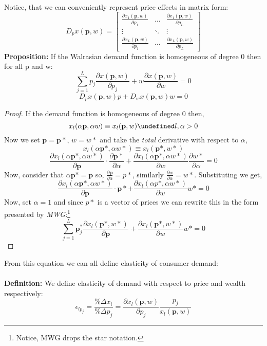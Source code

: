 \documentclass[12pt]{article}
\let\oldforall\forall
\let\forall\undefined
\let\bf\oldbf
\let\bf\textbf
\DeclareMathOperator{\forall}{\,\oldforall\,}
\begin{document}
\\ Notice, that we can conveniently represent price effects in matrix form:
$$D_p x(\bf{p}, w) = \begin{bmatrix} 
\frac{\partial x_1(\bf{p}, w)}{\partial p_1} & \dots & \frac{\partial x_1(\bf{p}, w)}{\partial p_L}\\
 \vdots & \ddots & \vdots \\
\frac{\partial x_L(\bf{p}, w)}{\partial p_1} & \dots & \frac{\partial x_L(\bf{p}, w)}{\partial p_L} 
\end{bmatrix}$$
\bf{Proposition:} If the Walrasian demand function is homogeneous of degree 0 then for all p and w: 
$$\sum^L_{j=1} p_j \frac{\partial x(\bf{p}, w)}{\partial p_j} + w\frac{\partial x(\bf{p}, w)}{\partial w} = 0$$
$$D_px(\bf{p}, w)p + D_wx(\bf{p}, w)w = 0$$

\begin{proof}
If the demand function is homogeneous of degree 0 then,
$$x_l(\alpha\bf{p}, \alpha w) \equiv x_l(\bf{p}, w) \forall l, \alpha > 0$$
Now we set $\bf{p} = \bf{p}*$, $w = w*$ and take the \emph{total} derivative with respect to $\alpha$,
$$x_l(\alpha\bf{p}*, \alpha w*) \equiv x_l(\bf{p}*, w*)$$
$$\frac{\partial x_l(\alpha \bf{p}*, \alpha w*)}{\partial \bf{p}}\cdot\frac{\partial \bf{p}*}{\partial \alpha} + \frac{\partial x_l(\alpha \bf{p}*, \alpha w*)}{\partial w}\frac{\partial w*}{\partial \alpha} = 0$$
Now, consider that $\alpha \bf{p}* = \bf{p}$ so, $\frac{\partial \bf{p}}{\partial \alpha} = p*$, similarly $\frac{\partial w}{\partial \alpha} = w*$. Substituting we get,
$$\frac{\partial x_l(\alpha \bf{p}*, \alpha w*)}{\partial \bf{p}}\cdot \bf{p}*+ \frac{\partial x_l(\alpha p*, \alpha w*)}{\partial w}w* = 0$$
Now, set $\alpha = 1$ and since $p*$ is a vector of prices we can rewrite this in the form presented by \emph{MWG}:\footnote{Notice, MWG drops the star notation.}
\begin{equation}
\sum^L_{j=1}\bf{p}_j^*\frac{\partial x_l( \bf{p}*, w*)}{\partial \bf{p}} + \frac{\partial x_l( \bf{p}*,  w*)}{\partial w}w* = 0
\end{equation}

\end{proof}
From this equation we can all define elasticity of consumer demand:
\\\bf{\\Definition:} We define elasticity of demand with respect to price and wealth respectively:
$$\epsilon_{lp_j} = \frac{\%\Delta x_i}{\%\Delta p_j} = \frac{\partial x_l(\bf{p}, w)}{\partial p_j}\frac{p_j}{x_l(\bf{p}, w)}$$
\end{document}
